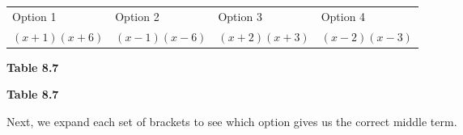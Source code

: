           \begin{table}[H]
        \begin{center}
      \label{m39394*id276099}
    \noindent
      \tablelasttail{}
      \begin{xtabular}[t]{|l|l|l|l|}\hline
        Option 1 &
        Option 2 &
        Option 3 &
        Option 4%
     \tabularnewline{}
                $\left(x+1\right)\left(x+6\right)$
               &
                $\left(x-1\right)\left(x-6\right)$
               &
                $\left(x+2\right)\left(x+3\right)$
               &
                $\left(x-2\right)\left(x-3\right)$
     \tabularnewline{}
    \end{xtabular}
      \end{center}
    \begin{center}{\small\bfseries Table 8.7}\end{center}
    \begin{caption}{\small\bfseries Table 8.7}\end{caption}
\end{table}
    \par
      \label{m39394*id276261}Next, we expand each set of brackets to see which option gives us the correct middle term.\par 
